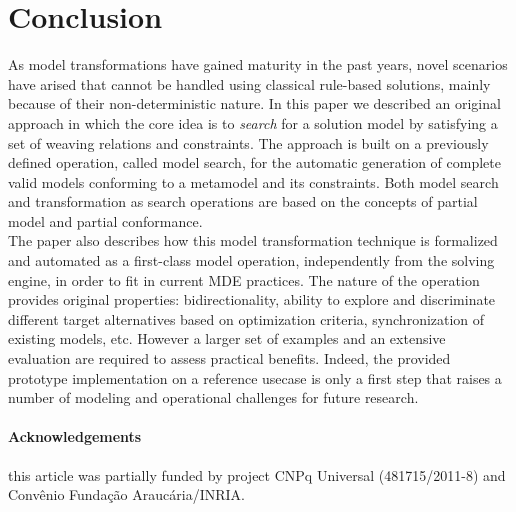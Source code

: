 \documentclass{llncs}
\begin{document}
\section{Conclusion}
\label{sec:conclusion}
%
As model transformations have gained maturity in the past years, novel scenarios
have arised that cannot be handled using classical rule-based solutions, mainly
because of their non-deterministic nature. In this paper we described an original
approach in which the core idea is to \emph{search} for a solution model by
satisfying a set of weaving relations and constraints. The approach is built on a
previously defined operation, called model search, for the automatic generation
of complete valid models conforming to a metamodel and its constraints. Both
model search and transformation as search operations are based on the concepts of partial model and partial conformance.\\
The paper also describes how this model transformation technique is
formalized and automated as a first-class model operation, independently from
the solving engine, in order to fit in current MDE practices. The nature of the operation provides
original properties: bidirectionality, ability to explore and discriminate different target alternatives based on optimization criteria, synchronization of existing models, etc. However a larger set of examples and an extensive evaluation are required to assess practical benefits. Indeed, the provided prototype implementation on a reference usecase is only a first step that raises a number of modeling and operational challenges for future research.\\
%
\paragraph{Acknowledgements} this article was partially funded by project CNPq Universal (481715/2011-8) and Convênio Fundação Araucária/INRIA.
%
%


%
\end{document}
